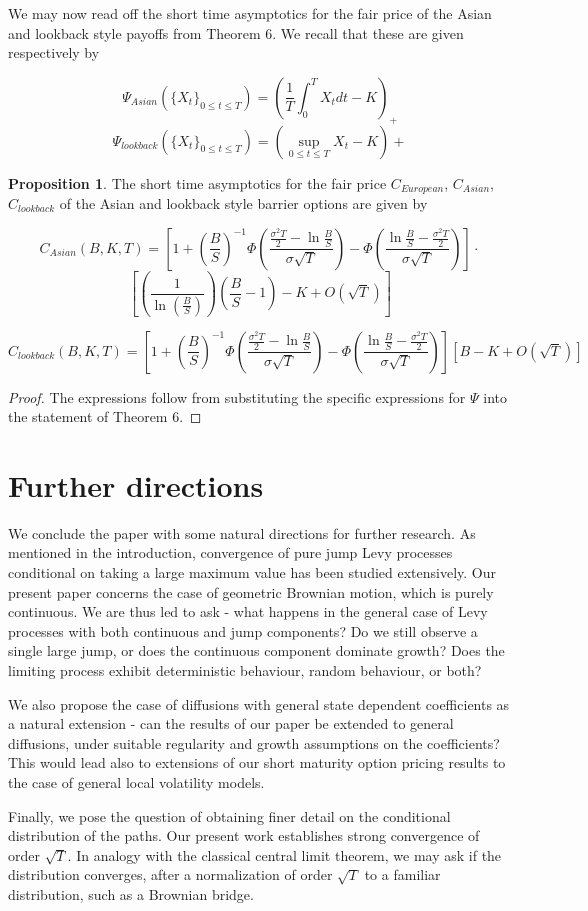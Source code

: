 \documentclass{article}
\theoremstyle{definition}
\newtheorem{proposition}[theorem]{Proposition}
\theoremstyle{definition}
\begin{document}
We may now read off the short time asymptotics for the fair price of the Asian and lookback style payoffs from Theorem 6. We recall that these are given respectively by

$$\Psi_{Asian} (\{X_t\}_{0 \leq t \leq T}) = \left (\frac{1}{T} \int_0^T X_t dt - K \right )_+$$
$$\Psi_{lookback} (\{X_t\}_{0 \leq t \leq T}) = \left(\sup_{0 \leq t \leq T} X_t - K \right)+$$
\begin{proposition} The short time asymptotics for the fair price $C_{European}$, $C_{Asian}$, $C_{lookback}$ of the Asian and lookback style barrier options are given by

$$C_{Asian}(B, K, T)= \left [ 1+\left (\frac{B}{S}\right )^{-1} \Phi\left(\frac{\frac{\sigma^{2} T}{2}-\ln \frac{B}{S}}{\sigma \sqrt{T}}\right)-\Phi\left(\frac{\ln \frac{B}{S} -\frac{\sigma^2 T}{2}}{\sigma \sqrt{T}}\right) \right ] \cdot $$
$$\left [\left(\frac{1}{\ln (\frac{B}{S} )} \right ) \left (\frac{B}{S}  - 1 \right ) - K + O(\sqrt{T})\right] $$

$$C_{lookback}(B, K, T)=\left [ 1+\left (\frac{B}{S}\right )^{-1} \Phi\left(\frac{\frac{\sigma^{2} T}{2}-\ln \frac{B}{S}}{\sigma \sqrt{T}}\right)-\Phi\left(\frac{\ln \frac{B}{S} -\frac{\sigma^2 T}{2}}{\sigma \sqrt{T}}\right) \right ]\left[B - K + O(\sqrt{T})\right]
$$
\end{proposition}

\begin{proof} The expressions follow from substituting the specific expressions for $\Psi$ into the statement of Theorem 6.\end{proof}

\section{Further directions}
We conclude the paper with some natural directions for further research. As mentioned in the introduction, convergence of pure jump Levy processes conditional on taking a large maximum value has been studied extensively. Our present paper concerns the case of geometric Brownian motion, which is purely continuous. We are thus led to ask - what happens in the general case of Levy processes with both continuous and jump components? Do we still observe a single large jump, or does the continuous component dominate growth? Does the limiting process exhibit deterministic behaviour, random behaviour, or both?

We also propose the case of diffusions with general state dependent coefficients as a natural extension - can the results of our paper be extended to general diffusions, under suitable regularity and growth assumptions on the coefficients? This would lead also to extensions of our short maturity option pricing results to the case of general local volatility models.

Finally, we pose the question of obtaining finer detail on the conditional distribution of the paths. Our present work establishes strong convergence of order $\sqrt T$. In analogy with the classical central limit theorem, we may ask if the distribution converges, after a normalization of order $\sqrt T$ to a familiar distribution, such as a Brownian bridge.
\printbibliography
\end{document}
